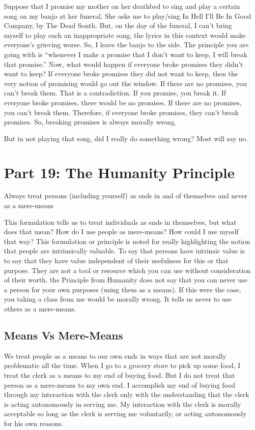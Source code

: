 Suppose that I promise my mother on her deathbed to sing and play a certain song on my banjo at her funeral. She asks me to play/sing In Hell I'll Be In Good Company, by The Dead South. But, on the day of the funeral, I can't bring myself to play such an inappropriate song, the lyrics in this context would make everyone's grieving worse. So, I leave the banjo to the side. The principle you are going with is “whenever I make a promise that I don’t want to keep, I will break that promise.” Now, what would happen if everyone broke promises they didn’t want to keep? If everyone broke promises they did not want to keep, then the very notion of promising would go out the window. If there are no promises, you can’t break them. That is a contradiction. If you promise, you break it. If everyone broke promises, there would be no promises. If there are no promises, you can’t break them. Therefore, if everyone broke promises, they can’t break promises. So, breaking promises is always morally wrong.

But in not playing that song, did I really do something wrong? Most will say no.

\chapter{Part 19: The Humanity Principle}
\begin{center}
Always treat persons (including yourself) as ends in and of themselves and never as a mere-means
\end{center}
This formulation tells us to treat individuals as ends in themselves, but what does that mean? How do I use people as mere-means? How could I use myself that way? This formulation or principle is noted for really highlighting the notion that people are intrinsically valuable. To say that persons have intrinsic value is to say that they have value independent of their usefulness for this or that purpose.  They are not a tool or resource which you can use without consideration of their worth. the Principle from Humanity does not say that you can never use a person for your own purposes (using them as a means). If this were the case, you taking a class from me would be morally wrong. It tells us never to use others as a mere-means.
\section{Means Vs Mere-Means}

We treat people as a means to our own ends in ways that are not morally problematic all the time. When I go to a grocery store to pick up some food, I treat the clerk as a means to my end of buying food. But I do not treat that person as a mere-means to my own end. I accomplish my end of buying food through my interaction with the clerk only with the understanding that the clerk is acting autonomously in serving me. My interaction with the clerk is morally acceptable so long as the clerk is serving me voluntarily, or acting autonomously for his own reasons.

